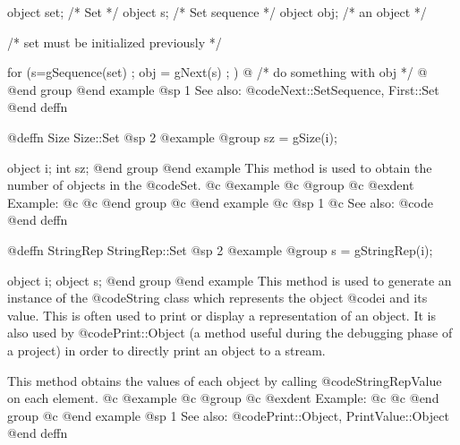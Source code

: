 object  set; /*  Set           */
object  s;   /*  Set sequence  */
object  obj; /*  an object     */

/*  set must be initialized previously  */

for (s=gSequence(set) ; obj = gNext(s) ; )  @{
        /*  do something with obj  */
@}
@end group
@end example
@sp 1
See also:  @code{Next::SetSequence, First::Set}
@end deffn




















@deffn {Size} Size::Set
@sp 2
@example
@group
sz = gSize(i);

object  i;
int     sz;
@end group
@end example
This method is used to obtain the number of objects in the @code{Set}.
@c @example
@c @group
@c @exdent Example:
@c 
@c @end group
@c @end example
@c @sp 1
@c See also:  @code{}
@end deffn










@deffn {StringRep} StringRep::Set
@sp 2
@example
@group
s = gStringRep(i);

object  i;
object  s;
@end group
@end example
This method is used to generate an instance of the @code{String} class
which represents the object @code{i} and its value.  This is often used
to print or display a representation of an object.  It is also used
by @code{Print::Object} (a method useful during the debugging phase of a
project) in order to directly print an object to a stream.

This method obtains the values of each object by calling
@code{StringRepValue} on each element.
@c @example
@c @group
@c @exdent Example:
@c 
@c @end group
@c @end example
@sp 1
See also:  @code{Print::Object, PrintValue::Object}
@end deffn












